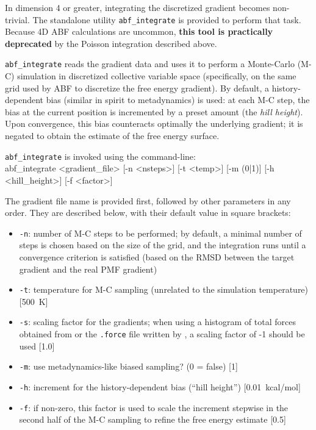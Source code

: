 In dimension 4 or greater, integrating the discretized gradient becomes non-trivial. The
standalone utility \texttt{abf\_integrate} is provided to perform that task.
Because 4D ABF calculations are uncommon, \textbf{this tool is practically deprecated} by
the Poisson integration described above.

\texttt{abf\_integrate} reads the gradient data and uses it to perform a Monte-Carlo (M-C)
simulation in discretized collective variable space (specifically, on the same grid
used by ABF to discretize the free energy gradient).
By default, a history-dependent bias (similar in spirit to metadynamics) is used:
at each M-C step, the bias at the current position is incremented by a preset amount
(the \emph{hill height}).
Upon convergence, this bias counteracts optimally the underlying gradient;
it is negated to obtain the estimate of the free energy surface.

\texttt{abf\_integrate} is invoked using the command-line:\\
{\small \noindent\ttfamily
abf\_integrate <gradient\_file> [-n <nsteps>] [-t <temp>] [-m (0|1)] [-h <hill\_height>] [-f <factor>]
}

The gradient file name is provided first, followed by other parameters in any order.
They are described below, with their default value in square brackets:
\begin{itemize}
\setlength{\itemsep}{0pt}
\item \texttt{-n}: number of M-C steps to be performed; by default, a minimal number of
steps is chosen based on the size of the grid, and the integration runs until a convergence
criterion is satisfied (based on the RMSD between the target gradient and the real PMF gradient)
\item \texttt{-t}: temperature for M-C sampling (unrelated to the simulation temperature)
  [500~K]
\item \texttt{-s}: scaling factor for the gradients; when using a histogram of total forces obtained from  or the \texttt{.force} file written by , a scaling factor of -1 should be used [1.0]
\item \texttt{-m}: use metadynamics-like biased sampling? (0 = false) [1]
\item \texttt{-h}: increment for the history-dependent bias (``hill height'') [0.01~kcal/mol]
\item \texttt{-f}: if non-zero, this factor is used to scale the increment stepwise in the
  second half of the M-C sampling to refine the free energy estimate [0.5]
\end{itemize}

